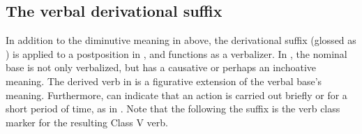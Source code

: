 \subsection{The verbal derivational suffix }\label{vblzST}
In addition to the diminutive meaning in  above, 
the derivational suffix  (glossed as ) is applied to a postposition in , and functions as a verbalizer. In , the nominal base is not only verbalized, but has a causative or perhaps an inchoative meaning. The derived verb in  is a figurative extension of the verbal base’s meaning. 
Furthermore,  can indicate that an action is carried out briefly or for a short period of time, as in . 
\ea\label{vblzSTex1}
\z
\ea\label{vblzSTex2}
\z
\ea\label{vblzSTex3}
\z
\ea\label{vblzSTex4}
\z
Note that the  following the  suffix is the verb class marker for the resulting Class V verb. 




